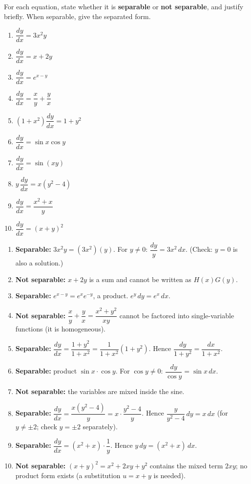 \documentclass[11pt]{article}
\begin{document}
\begin{exercice}
For each equation, state whether it is \textbf{separable} or \textbf{not separable}, and justify briefly. When separable, give the separated form.
\begin{enumerate}
\item $\dfrac{dy}{dx} = 3x^2 y$
\item $\dfrac{dy}{dx} = x + 2y$
\item $\dfrac{dy}{dx} = e^{x - y}$
\item $\dfrac{dy}{dx} = \dfrac{x}{y} + \dfrac{y}{x}$
\item $(1+x^2)\dfrac{dy}{dx} = 1 + y^2$
\item $\dfrac{dy}{dx} = \sin x \cos y$
\item $\dfrac{dy}{dx} = \sin(x y)$
\item $y\,\dfrac{dy}{dx} = x(y^2 - 4)$
\item $\dfrac{dy}{dx} = \dfrac{x^2 + x}{y}$
\item $\dfrac{dy}{dx} = (x + y)^2$
\end{enumerate}
\end{exercice}

\begin{corrige}[Exercise 1]
\begin{enumerate}
\item \textbf{Separable:} $3x^2 y = (3x^2)(y)$. For $y \neq 0$: $\dfrac{dy}{y} = 3x^2\,dx$. (Check: $y = 0$ is also a solution.)
\item \textbf{Not separable:} $x + 2y$ is a sum and cannot be written as $H(x)G(y)$.
\item \textbf{Separable:} $e^{x-y} = e^x e^{-y}$, a product. $e^{y}\,dy = e^{x}\,dx$.
\item \textbf{Not separable:} $\dfrac{x}{y} + \dfrac{y}{x} = \dfrac{x^2+y^2}{xy}$ cannot be factored into single-variable functions (it is homogeneous).
\item \textbf{Separable:} $\dfrac{dy}{dx} = \dfrac{1+y^2}{1+x^2} = \dfrac{1}{1+x^2}(1+y^2)$. Hence $\dfrac{dy}{1+y^2} = \dfrac{dx}{1+x^2}$.
\item \textbf{Separable:} product $\sin x \cdot \cos y$. For $\cos y \neq 0$: $\dfrac{dy}{\cos y} = \sin x\,dx$.
\item \textbf{Not separable:} the variables are mixed inside the sine.
\item \textbf{Separable:} $\dfrac{dy}{dx} = \dfrac{x(y^2-4)}{y} = x\cdot\dfrac{y^2-4}{y}$. Hence $\dfrac{y}{y^2-4}\,dy = x\,dx$ (for $y \neq \pm 2$; check $y = \pm 2$ separately).
\item \textbf{Separable:} $\dfrac{dy}{dx} = (x^2+x)\cdot\dfrac{1}{y}$. Hence $y\,dy = (x^2+x)\,dx$.
\item \textbf{Not separable:} $(x+y)^2 = x^2 + 2xy + y^2$ contains the mixed term $2xy$; no product form exists (a substitution $u = x+y$ is needed).
\end{enumerate}
\end{corrige}
\end{document}
